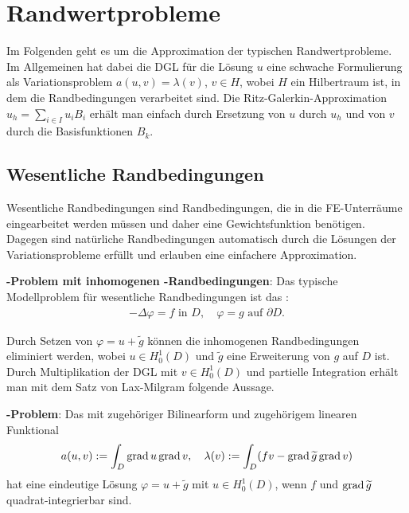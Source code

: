 \chapter{%
    Randwertprobleme%
}

Im Folgenden geht es um die Approximation der typischen Randwertprobleme.
Im Allgemeinen hat dabei die DGL für die Lösung $u$ eine schwache Formulierung
als Variationsproblem $a(u, v) = \lambda(v)$, $v \in H$,
wobei $H$ ein Hilbertraum ist, in dem die Randbedingungen verarbeitet sind.
Die Ritz-Galerkin-Approximation $u_h = \sum_{i \in I} u_i B_i$ erhält man einfach durch
Ersetzung von $u$ durch $u_h$ und von $v$ durch die Basisfunktionen $B_k$.

\section{%
    Wesentliche Randbedingungen%
}

Wesentliche Randbedingungen sind Randbedingungen, die in die FE-Unterräume eingearbeitet werden
müssen und daher eine Gewichtsfunktion benötigen.
Dagegen sind natürliche Randbedingungen automatisch durch die Lösungen der Variationsprobleme
erfüllt und erlauben eine einfachere Approximation.

\textbf{-Problem mit inhomogenen -Randbedingungen}:
Das typische Modellproblem für wesentliche Randbedingungen ist das
:
\begin{align*}
    -\Delta \varphi = f \text{ in } D,\quad
    \varphi = g \text{ auf } \partial D.
\end{align*}

Durch Setzen von $\varphi = u + \widetilde{g}$ können die inhomogenen Randbedingungen eliminiert
werden, wobei $u \in H_0^1(D)$ und $\widetilde{g}$ eine Erweiterung von $g$ auf $D$ ist.
Durch Multiplikation der DGL mit $v \in H_0^1(D)$ und partielle Integration erhält man
mit dem Satz von Lax-Milgram folgende Aussage.

\textbf{-Problem}:
Das 
mit zugehöriger Bilinearform und zugehörigem linearen Funktional
\begin{align*}
    a(u, v) := \int_D \operatorname{grad} u \operatorname{grad} v,\quad
    \lambda(v) := \int_D (fv - \operatorname{grad} \widetilde{g} \operatorname{grad} v)
\end{align*}
hat eine eindeutige Lösung $\varphi = u + \widetilde{g}$ mit $u \in H_0^1(D)$,
wenn $f$ und $\operatorname{grad} \widetilde{g}$ quadrat-integrierbar sind.


